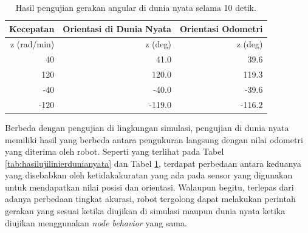 \begin{table}
  \caption{Hasil pengujian gerakan angular di dunia nyata selama 10 detik.}
  \label{tab:hasilujiangulardunianyata}
  \centering
  \begin{tabular}{r|r|r}
    \toprule
    Kecepatan   & Orientasi di Dunia Nyata  & Orientasi Odometri \\
    \midrule
    z (rad/min) & z (deg)                   & z (deg) \\
    \midrule
    40          & 41.0                      & 39.6 \\
    120         & 120.0                     & 119.3 \\
    -40         & -40.0                     & -39.6 \\
    -120        & -119.0                    & -116.2 \\
    \bottomrule
  \end{tabular}
\end{table}

Berbeda dengan pengujian di lingkungan simulasi, pengujian di dunia nyata memiliki hasil yang berbeda antara pengukuran langsung dengan nilai odometri yang diterima oleh robot.
Seperti yang terlihat pada Tabel \ref{tab:hasilujilinierdunianyata} dan Tabel \ref{tab:hasilujiangulardunianyata}, terdapat perbedaan antara keduanya yang disebabkan oleh ketidakakuratan yang ada pada sensor yang digunakan untuk mendapatkan nilai posisi dan orientasi.
Walaupun begitu, terlepas dari adanya perbedaan tingkat akurasi, robot tergolong dapat melakukan perintah gerakan yang sesuai ketika diujikan di simulasi maupun dunia nyata ketika diujikan menggunakan \emph{node behavior} yang sama.
